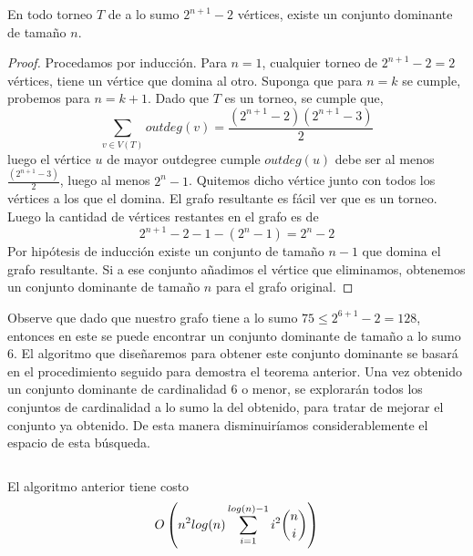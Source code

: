 \documentclass{article}
\begin{document}
\begin{theorem}
	En todo torneo $T$ de a lo sumo $2^{n+1}-2$ vértices, existe un 
	conjunto dominante de tamaño $n$.
\end{theorem}

\begin{proof}
	Procedamos por inducción. Para $n=1$, cualquier torneo de $2^{n+1}
	-2=2$ vértices, tiene un vértice que domina al otro. Suponga que para 
	$n=k$ se cumple, probemos para $n=k+1$. Dado que $T$ es un torneo, se 
	cumple que,
	$$\sum_{v\in V(T)} outdeg(v) = \frac{(2^{n+1}-2)(2^{n+1}-3)}{2}$$
	luego el vértice $u$ de mayor outdegree cumple $outdeg(u)$ debe ser 
	al menos $\frac{(2^{n+1}-3)}{2}$, luego al menos $2^n-1$. Quitemos 
	dicho vértice junto con todos los vértices a los que el domina. El 
	grafo resultante es fácil ver que es un torneo. Luego la cantidad de 
	vértices restantes en el grafo es de
	\begin{equation*}
		2^{n+1}-2-1-(2^n-1) = 2^n - 2
	\end{equation*}
	Por hipótesis de inducción existe un conjunto de tamaño $n-1$ que 
	domina el grafo resultante. Si a ese conjunto añadimos el vértice que 
	eliminamos, obtenemos un conjunto dominante de tamaño $n$ para el 
	grafo original.
	
\end{proof}

Observe que dado que nuestro grafo tiene a lo sumo $75\le 2^{6+1}-2=128$, entonces 
en este se puede encontrar un conjunto dominante de tamaño a lo sumo $6$. El 
algoritmo que diseñaremos para obtener este conjunto dominante se basará en el 
procedimiento seguido para demostra el teorema anterior. Una vez obtenido un 
conjunto dominante de cardinalidad $6$ o menor, se explorarán todos los conjuntos de 
cardinalidad a lo sumo la del obtenido, para tratar de mejorar el conjunto ya 
obtenido. De esta manera disminuiríamos considerablemente el espacio de esta 
búsqueda.

\inputminted[firstline=13,linenos=false]{python}{code.py}

\begin{theorem}
	El algoritmo anterior tiene costo
	$$O\left( n^2log(n)\sum_{i=1}^{log(n)-1}i^2 \binom{n}{i} \right)$$
\end{theorem}
\end{document}
